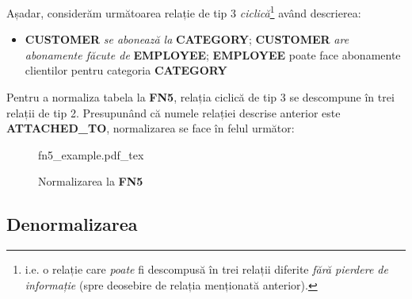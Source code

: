\documentclass[a4paper, oneside, 12pt]{article}
\newcommand{\incfig}[1]{%
    \def\svgwidth{\columnwidth}
    {#1.pdf_tex}
}
\begin{document}
Așadar, considerăm următoarea relație de tip 3 \emph{ciclică}\footnote{i.e. o
relație care \emph{poate} fi descompusă în trei relații diferite \emph{fără
pierdere de informație} (spre deosebire de relația menționată anterior).} având
descrierea:

\begin{itemize}[label=\textbullet, noitemsep, topsep=0pt, after=]
        \item \textbf{CUSTOMER} \emph{se abonează la} \textbf{CATEGORY};
              \textbf{CUSTOMER} \emph{are abonamente făcute de} \textbf{EMPLOYEE};
              \textbf{EMPLOYEE} poate face abonamente clientilor pentru categoria \textbf{CATEGORY}

\end{itemize}

Pentru a normaliza tabela la \textbf{FN5}, relația ciclică de tip 3 se
descompune în trei relații de tip 2. Presupunând că numele relației descrise
anterior este \textbf{ATTACHED\_TO}, normalizarea se face în felul următor:

\begin{figure}[H]
    \centering
    \incfig{fn5_example}
    \caption{Normalizarea la \textbf{FN5}}
    \label{fig:norm5}
\end{figure}

\subsection{Denormalizarea}
\end{document}
